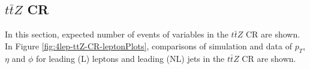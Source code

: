 \subsection{$t\bar{t}Z$ CR}
\label{sec:controlplotstetralepton-ttZ-CR}


In this section, expected number of events of variables in the $t\bar{t}Z$ CR are shown. In Figure \ref{fig:4lep-ttZ-CR-leptonPlots}, comparisons of simulation and data of $p_{T}$, $\eta$ and $\phi$ for leading (L) leptons and leading (NL) jets in the $t\bar{t}Z$ CR are shown.
\begin{figure}[htbp]
\centering
  \begin{tabular}{ccc}



\end{tabular}
\end{figure}
